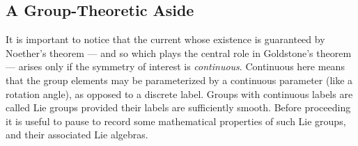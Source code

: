\documentclass[12pt,epsf]{report}
\begin{document}
\subsection{A Group-Theoretic Aside}

It is important to notice that the current whose existence
is guaranteed by Noether's theorem --- and so which plays
the central role in Goldstone's theorem --- arises only
if the symmetry of interest is {\it continuous}. Continuous
here means that the group elements may be parameterized 
by a continuous parameter (like a rotation angle), as opposed
to a discrete label. Groups with continuous labels are
called Lie groups provided their labels are sufficiently
smooth. Before proceeding it is useful to pause to 
record some mathematical properties of such 
Lie groups, and their associated Lie algebras. 
\end{document}
